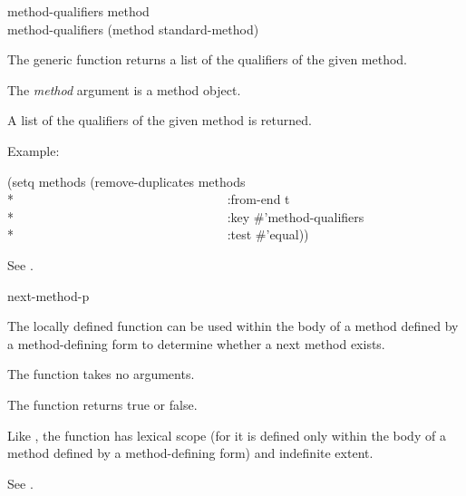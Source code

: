 \begin{defun}
method-qualifiers method \\
method-qualifiers (method standard-method)

The generic function  returns a list of the
qualifiers of the given method.





The \emph{method\/} argument is a method object. 


A list of the qualifiers of the given method is returned.

Example:
\begin{lisp}
(setq methods (remove-duplicates methods \\*
~~~~~~~~~~~~~~~~~~~~~~~~~~~~~~~~~:from-end t \\*
~~~~~~~~~~~~~~~~~~~~~~~~~~~~~~~~~:key \#'method-qualifiers \\*
~~~~~~~~~~~~~~~~~~~~~~~~~~~~~~~~~:test \#'equal))
\end{lisp}

See .
\end{defun}

 

\begin{defun}[Function]
next-method-p

The locally defined function  can be used within
the body of a method defined by a method-defining form to determine
whether a next method exists.





The function  takes no arguments.


The function  returns true or false.


Like , the function  has 
lexical scope (for it
is defined only within the body of a method defined by a method-defining form)
and indefinite extent.

See .

\end{defun}



